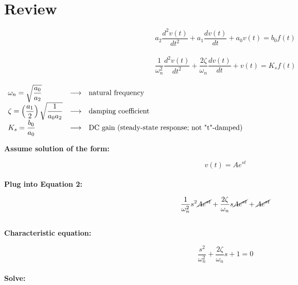 \documentclass[10pt]{report}
\begin{document}
\section*{Review}

 \begin{equation}
 a_2 \dfrac{d^2v(t)}{dt^2} + a_1 \dfrac{dv(t)}{dt} + a_0 v(t) = b_0 f(t)  \end{equation} \\ 

\begin{equation} \dfrac{1}{\omega_n^2} \dfrac{d^2 v(t)}{dt^2} + \dfrac{2\zeta}{\omega_n} \dfrac{dv(t)}{dt} + v(t) = K_s f(t) \end{equation} \\ 

 $\begin{array}{llp{5in}}

\omega_n = \sqrt{\dfrac{a_0}{a_2}} & \longrightarrow & natural frequency  \\

\zeta = \left(\dfrac{a_1}{2}\right) \sqrt{\dfrac{1}{a_0a_2}} & \longrightarrow & damping coefficient \\

K_s = \dfrac{b_0}{a_0} &  \longrightarrow &  DC gain (steady-state response; not "t"-damped) \\

\end{array}$  \\ \vspace{5mm}

{\bf Assume solution of the form:}

\begin{equation} v(t) = Ae^{st} \end{equation} \\

{\bf Plug into Equation 2:}

\begin{equation} \dfrac{1}{\omega_n^2}s^2\cancel{Ae^{st}} + \dfrac{2\zeta}{\omega_n}s \cancel{Ae^{st}} + \cancel{Ae^{st}} \end{equation} \\

{\bf Characteristic equation:}

\begin{equation} \dfrac{s^2}{\omega_n^2} + \dfrac{2\zeta}{\omega_n}s + 1 = 0 \end{equation} \\

{\bf Solve:}
\end{document}
